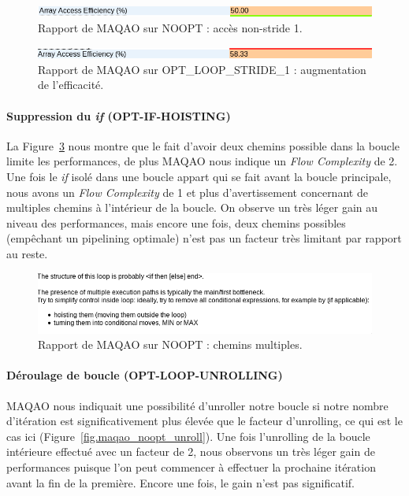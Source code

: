 \documentclass[12pt,a4paper]{article}
\begin{document}
\begin{figure}[h]
    \centering
    \includegraphics[scale=0.4]{./figures/L1/maqao_noopt_non-unit-stride.png}
    \caption{Rapport de MAQAO sur NOOPT : accès non-stride 1.}
    \label{fig.maqao_noopt_non-unit-stride}
\end{figure}

\begin{figure}[h]
    \centering
    \includegraphics[scale=0.4]{./figures/L1/maqao_noopt_unit-stride.png}
    \caption{Rapport de MAQAO sur OPT\_LOOP\_STRIDE\_1 : augmentation de l'efficacité.}
    \label{fig.maqao_noopt_unit-stride}
\end{figure}

\paragraph{Suppression du \textit{if} (OPT-IF-HOISTING)} La
Figure~\ref{fig.maqao_noopt_if} nous montre que le fait d'avoir deux chemins
possible dans la boucle limite les performances, de plus MAQAO nous indique un
\textit{Flow Complexity} de 2. Une fois le \textit{if} isolé dans une boucle
appart qui se fait avant la boucle principale, nous avons un \textit{Flow
Complexity} de 1 et plus d'avertissement concernant de multiples chemins à
l'intérieur de la boucle. On observe un très léger gain au niveau des
performances, mais encore une fois, deux chemins possibles (empêchant un
pipelining optimale) n'est pas un facteur très limitant par rapport au reste.

\begin{figure}[h]
    \centering
    \includegraphics[scale=0.4]{./figures/L1/maqao_noopt_if.png}
    \caption{Rapport de MAQAO sur NOOPT : chemins multiples.}
    \label{fig.maqao_noopt_if}
\end{figure}

\paragraph{Déroulage de boucle (OPT-LOOP-UNROLLING)}
MAQAO nous indiquait une possibilité d'unroller notre boucle si notre nombre
d'itération est significativement plus élevée que le facteur d'unrolling, ce qui
est le cas ici (Figure~\ref{fig.maqao_noopt_unroll}). Une fois l'unrolling de la
boucle intérieure effectué avec un facteur de 2, nous observons un très léger
gain de performances puisque l'on peut commencer à effectuer la prochaine
itération avant la fin de la première. Encore une fois, le gain n'est pas
significatif.
\end{document}
